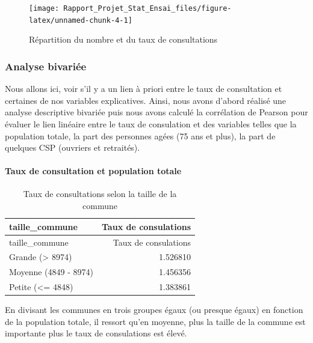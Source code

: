 \documentclass[
]{article}
\begin{document}
\begin{figure}

{\centering \texttt{[image: Rapport\_Projet\_Stat\_Ensai\_files/figure-latex/unnamed-chunk-4-1]} 

}

\caption{Répartition du nombre et du taux de consultations}\label{fig:unnamed-chunk-4}
\end{figure}

\hypertarget{analyse-bivariuxe9e}{%
\subsubsection{Analyse bivariée}\label{analyse-bivariuxe9e}}

Nous allons ici, voir s'il y a un lien à priori entre le taux de
consultation et certaines de nos variables explicatives. Ainsi, nous
avons d'abord réalisé une analyse descriptive bivariée puis nous avons
calculé la corrélation de Pearson pour évaluer le lien linéaire entre le
taux de consulation et des variables telles que la population totale, la
part des personnes agées (75 ans et plus), la part de quelques CSP
(ouvriers et retraités).

\hypertarget{taux-de-consultation-et-population-totale}{%
\paragraph{Taux de consultation et population
totale}\label{taux-de-consultation-et-population-totale}}

\begin{longtable}[]{@{}lr@{}}
\caption{Taux de consultations selon la taille de la
commune}\tabularnewline
\toprule\noalign{}
taille\_commune & Taux de consulations \\
\midrule\noalign{}
\endfirsthead
\toprule\noalign{}
taille\_commune & Taux de consulations \\
\midrule\noalign{}
\endhead
\bottomrule\noalign{}
\endlastfoot
Grande (\textgreater{} 8974) & 1.526810 \\
Moyenne (4849 - 8974) & 1.456356 \\
Petite (\textless= 4848) & 1.383861 \\
\end{longtable}

En divisant les communes en trois groupes égaux (ou presque égaux) en
fonction de la population totale, il ressort qu'en moyenne, plus la
taille de la commune est importante plus le taux de consulations est
élevé.
\end{document}
